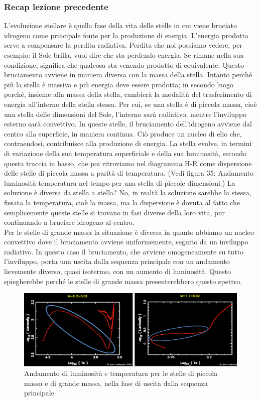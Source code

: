 \documentclass[a4paper,11pt]{article}
\begin{document}
    \subsubsection{Recap lezione precedente}
L'evoluzione stellare è quella fase della vita delle stelle in cui viene bruciato idrogeno come principale fonte per la produzione di energia. L'energia prodotta serve a compensare la perdita radiativa. Perdita che noi possiamo vedere, per esempio: il Sole brilla, vuol dire che sta perdendo energia. Se rimane nella sua condizione, significa che qualcosa sta venendo prodotto di equivalente. Questo bruciamento avviene in maniera diversa con la massa della stella. Intanto perché più la stella è massiva e più energia deve essere prodotta; in secondo luogo perché, insieme alla massa della stella, cambierà la modalità del trasferimento di energia all'interno della stella stessa. Per cui, se una stella è di piccola massa, cioè una stella delle dimensioni del Sole, l'interno sarà radiativo, mentre l'inviluppo esterno sarà convettivo. In queste stelle, il bruciamento dell'idrogeno avviene dal centro alla superficie, in maniera continua. Ciò produce un nucleo di elio che, contraendosi, contribuisce alla produzione di energia. La stella evolve, in termini di variazione della sua temperatura superficiale e della sua luminosità, secondo questa traccia in basso, che poi ritroviamo nel diagramma H-R come dispersione delle stelle di piccola massa a parità di temperatura. (Vedi figura 35: Andamento luminosità-temperatura nel tempo per una stella di piccole dimensioni.) La soluzione è diversa da stella a stella? No, in realtà la soluzione sarebbe la stessa, fissata la temperatura, cioè la massa, ma la dispersione è dovuta al fatto che semplicemente queste stelle si trovano in fasi diverse della loro vita, pur continuando a bruciare idrogeno al centro. \\
Per le stelle di grande massa la situazione è diversa in quanto abbiamo un nucleo convettivo dove il bruciamento avviene uniformemente, seguito da un inviluppo radiativo. In questo caso il bruciamento, che avviene omogeneamente su tutto l'inviluppo, porta una uscita dalla sequenza principale con un andamento lievemente diverso, quasi isotermo, con un aumento di luminosità. Questo spiegherebbe perché le stelle di grande massa presenterebbero questo spettro. \\ 
\begin{figure}[h!!]
        \centering
        \includegraphics[width=12cm]{lezione 28 novembre/luminositatemperaturagrafico.png}
        \caption{Andamento di luminosità e temperatura per le stelle di piccola massa e di grande massa, nella fase di uscita dalla sequenza principale}
        \label{lezione 28 novembre/luminositatemperaturagrafico.png}
    \end{figure}
\end{document}
